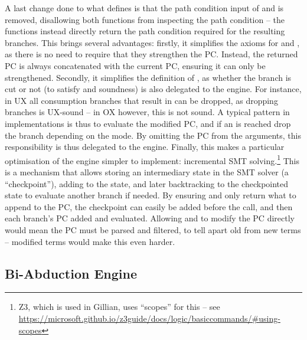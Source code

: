 A last change done to what \cite{cse2} defines is that the path condition input of  \consume{} and \produce{} is removed, disallowing both functions from inspecting the path condition -- the functions instead directly return the path condition required for the resulting branches. This brings several advantages: firstly, it simplifies the axioms for \consume{} and \produce{}, as there is no need to require that they strengthen the PC. Instead, the returned PC is always concatenated with the current PC, ensuring it can only be strengthened. Secondly, it simplifies the definition of \consume{}, as whether the branch is cut or not (to satisfy \OX{} and \UX{} soundness) is also delegated to the engine. For instance, in UX all consumption branches that result in \LFail{} can be dropped, as dropping branches is UX-sound -- in OX however, this is not sound. A typical pattern in \consume{} implementations is thus to evaluate the modified PC, and if an \LFail{} is reached drop the branch depending on the mode. By omitting the PC from the arguments, this responsibility is thus delegated to the engine. Finally, this makes a particular optimisation of the engine simpler to implement: incremental SMT solving.\footnote{Z3, which is used in Gillian, uses ``scopes'' for this -- see \url{https://microsoft.github.io/z3guide/docs/logic/basiccommands/\#using-scopes}} This is a mechanism that allows storing an intermediary state in the SMT solver (a ``checkpoint''), adding to the state, and later backtracking to the checkpointed state to evaluate another branch if needed. By ensuring \consume{} and \produce{} only return what to append to the PC, the checkpoint can easily be added before the call, and then each branch's PC added and evaluated. Allowing \consume{} and \produce{} to modify the PC directly would mean the PC must be parsed and filtered, to tell apart old from new terms -- modified terms would make this even harder.

\subsection{Bi-Abduction Engine}

